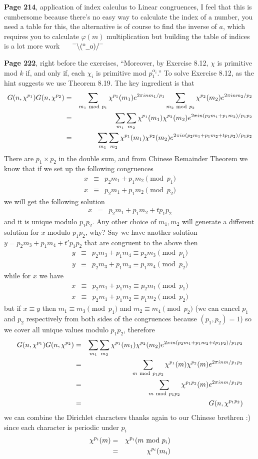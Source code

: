 \documentclass[aps,preprint,preprintnumbers,nofootinbib,showpacs,prd]{revtex4-1}
\newcommand{\nbea}{\begin{eqnarray*}}
\newcommand{\neea}{\end{eqnarray*}}
\newcommand{\dunno}{$ {}^{\mbox {--}}\backslash(^{\rm o}{}\underline{\hspace{0.2cm}}{\rm o})/^{\mbox {--}}$}
\begin{document}
{\bf Page 214}, application of index calculus to Linear congruences, I feel that this is cumbersome because there's no easy way to calculate the index of a number, you need a table for this, the alternative is of course to find the inverse of $a$, which requires you to calculate $\varphi(m)$ multiplication but building the table of indices is a lot more work ~~~\dunno


{\bf Page 222}, right before the exercises, ``Moreover, by Exercise 8.12, $\chi$ is primitive mod $k$ if, and only if, each $\chi_i$ is primitive mod $p_1^{\alpha_i}$.'' To solve Exercise 8.12, as the hint suggests we use Theorem 8.19. The key ingredient is that
%
\nbea
G(n,\chi^{p_1})G(n,\chi^{p_2}) & = & \sum_{m_1~{\rm mod}~p_1}\chi^{p_1}(m_1) e^{2\pi i nm_1/p_1}\sum_{m_2~{\rm mod}~p_2} \chi^{p_2}(m_2)e^{2\pi i n m_2/p_2} \\
& = & \sum_{m_1}\sum_{m_2} \chi^{p_1}(m_1)\chi^{p_2}(m_2) e^{2 \pi i n(p_2m_1 + p_1 m_2)/p_1p_2} \\
& = & \sum_{m_1}\sum_{m_2} \chi^{p_1}(m_1)\chi^{p_2}(m_2) e^{2 \pi i n(p_2m_1 + p_1 m_2 + tp_1p_2)/p_1p_2}
\neea
%
There are $p_1 \times p_2$ in the double sum, and from Chinese Remainder Theorem we know that if we set up the following congruences
%
\nbea
x & \equiv & p_2m_1 + p_1 m_2 \pmod{p_1} \\
x & \equiv & p_2m_1 + p_1 m_2 \pmod{p_2}
\neea
%
we will get the following solution
%
\nbea
x & = & p_2m_1 + p_1 m_2 + tp_1p_2
\neea
%
and it is unique modulo $p_1p_2$. Any other choice of $m_1, m_2$ will generate a different solution for $x$ modulo $p_1p_2$, why? Say we have another solution $y = p_2m_3 + p_1 m_4 + t'p_1p_2$ that are congruent to the above then
%
\nbea
y & \equiv & p_2m_3 + p_1 m_4 \equiv p_2 m_3 \pmod{p_1} \\
y & \equiv & p_2m_3 + p_1 m_4 \equiv p_1 m_4 \pmod{p_2}
\neea
%
while for $x$ we have
%
\nbea
x & \equiv & p_2m_1 + p_1 m_2 \equiv p_2 m_1 \pmod{p_1} \\
x & \equiv & p_2m_1 + p_1 m_2 \equiv p_1 m_2 \pmod{p_2}
\neea
%
but if $x \equiv y$ then $m_1 \equiv m_3 \pmod{p_1}$ and $m_2 \equiv m_4 \pmod{p_2}$ (we can cancel $p_1$ and $p_2$ respectively from both sides of the congruences because $(p_1,p_2) = 1$) so we cover all unique values modulo $p_1 p_2$, therefore
%
\nbea
G(n,\chi^{p_1})G(n,\chi^{p_2}) & = & \sum_{m_1}\sum_{m_2} \chi^{p_1}(m_1)\chi^{p_2}(m_2) e^{2 \pi i n(p_2m_1 + p_1 m_2 + tp_1p_2)/p_1p_2} \\
& = & \sum_{m ~{\rm mod}~ p_1p_2} \chi^{p_1}(m)\chi^{p_2}(m) e^{2 \pi i nm/p_1p_2} \\
& = & \sum_{m ~{\rm mod}~ p_1p_2} \chi^{p_1p_2}(m) e^{2 \pi i nm/p_1p_2} \\
& = & G(n, \chi^{p_1p_2})
\neea
%
we can combine the Dirichlet characters thanks again to our Chinese brethren :) since each character is periodic under $p_i$
%
\nbea
\chi^{p_i}(m) & = & \chi^{p_i}(m {\rm~mod~} p_i) \\
& = & \chi^{p_i}(m_i)
\neea
%
\end{document}
